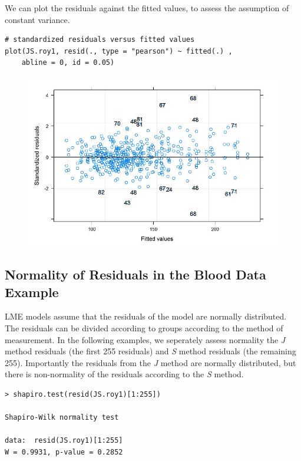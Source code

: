 \documentclass[Main.tex]{subfiles}
\begin{document}
We can plot the residuals against the fitted values, to assess the assumption of constant variance. 
\begin{framed}
\begin{verbatim}
# standardized residuals versus fitted values 
plot(JS.roy1, resid(., type = "pearson") ~ fitted(.) , 
    abline = 0, id = 0.05)
\end{verbatim}
\end{framed}
\begin{figure}[h!]
\centering
\includegraphics[width=0.9\linewidth]{Residuals-JS-Roy}
\caption{}
\label{fig:Residuals-JS-Roy}
\end{figure}

\subsection{Normality of Residuals in the Blood Data Example}
LME models assume that the residuals of the model are normally distributed.  The residuals can be divided according to groups according to the method of measurement. In the following examples, we seperately assess normality the \textit{J} method residuals (the first 255 residuals) and \textit{S} method residuals (the remaining 255). Importantly the residuals from the \textit{J} method are normally distributed, but there is non-normality of the residuals according to the \textit{S} method.
\begin{framed}
\begin{verbatim}
> shapiro.test(resid(JS.roy1)[1:255])

Shapiro-Wilk normality test

data:  resid(JS.roy1)[1:255]
W = 0.9931, p-value = 0.2852
\end{verbatim}
\end{framed}
\end{document}
